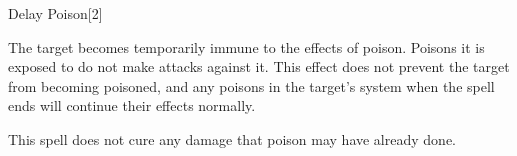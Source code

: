 \begin{spellsection}{Delay Poison}[2]
    \begin{spellheader}
    \end{spellheader}
    \begin{spellcontent}
        \begin{spelltargetinginfo}
        \end{spelltargetinginfo}
        \begin{spelleffects}
            \spelleffect The target becomes temporarily immune to the effects of poison. Poisons it is exposed to do not make attacks against it. This effect does not prevent the target from becoming poisoned, and any poisons in the target's system when the spell ends will continue their effects normally. 
            \spelldur \durshort
        \end{spelleffects}
    \end{spellcontent}
    \begin{spellfooter}
        \spellnotes This spell does not cure any damage that poison may have already done.
        \miscastrandom
    \end{spellfooter}
\end{spellsection}

